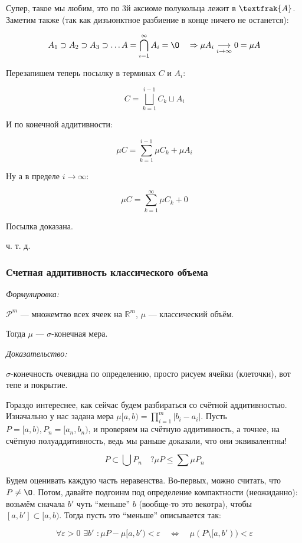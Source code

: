 \documentclass{article}
\def\dbl{\,\,}
\begin{document}
Супер, такое мы любим, это по 3й аксиоме полукольца лежит в $\textfrak{A}$. Заметим также (так как дизъюнктное разбиение в конце ничего не останется): 

\[A_1 \supset A_2 \supset A_3 \supset \ldots A = \bigcap_{i = 1}^{\infty} A_i = \O \quad \Rightarrow \mu A_i \underset{i \rightarrow \infty}{\longrightarrow} 0 = \mu A\]

Перезапишем теперь посылку в терминах $C$ и $A_i$:

\[C = \bigsqcup_{k = 1}^{i - 1} C_k \sqcup A_i\]

И по конечной аддитивности:

\[\mu C = \sum_{k = 1}^{i - 1} \mu C_k + \mu A_i\]

Ну а в пределе $i \rightarrow \infty$:

\[\mu C = \sum_{k = 1}^{\infty} \mu C_k + 0\]

Посылка доказана. 

ч. т. д. 


\subsubsection{Счетная аддитивность классического объема}
\textit{Формулировка:}

$\mathcal{P}^m$ --- множемтво всех ячеек на $\mathbb{R}^m$, $\mu$ --- классический объём.

Тогда $\mu$ --- $\sigma$-конечная мера.

\textit{Доказательство:}

$\sigma$-конечность очевидна по определению, просто рисуем ячейки (клеточки), вот тепе и покрытие.

Гораздо интереснее, как сейчас будем разбираться со счётной аддитивностью. Изначально у нас задана мера $\mu[a, b) = \prod_{i = 1}^{m} |b_i - a_i|$. Пусть $P = [a, b), P_n = [a_n, b_n)$, и проверяем на счётную аддитивность, а точнее, на счётную полуаддитивность, ведь мы раньше доказали, что они эквивалентны! 

\[P \subset \bigcup P_n \quad ? \mu P \le \sum \mu P_n\]

Будем оценивать каждую часть неравенства. Во-первых, можно считать, что $P \neq \O$. Потом, давайте подгоинм под определение компактности (неожиданно): возьмём сначала $b'$ чуть ``меньше'' $b$ (вообще-то это векотра), чтобы $[a, b'] \subset [a, b)$. Тогда пусть это ``меньше'' описывается так:

\[\forall \varepsilon > 0 \dbl \exists b' \dbl: \mu P - \mu [a, b') < \varepsilon \quad \Leftrightarrow \quad \mu(P \setminus [a, b')) < \varepsilon\]
\end{document}
